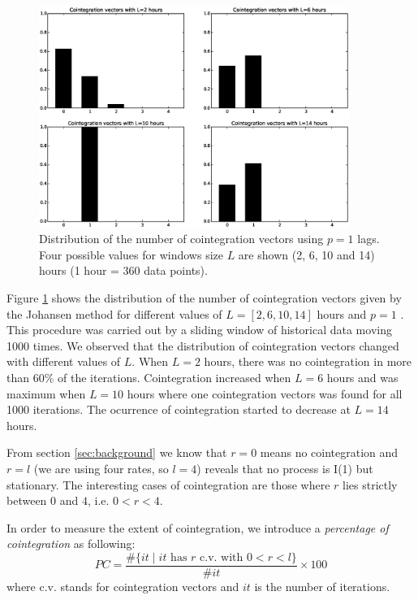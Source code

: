 \begin{figure}[!h]
  \centering
   \includegraphics[width=0.9\textwidth]{img/Fig1}
  \caption{Distribution of the number of cointegration vectors using $p=1$ lags.
  Four possible values for windows size $L$ are shown (2, 6, 10 and 14) hours (1
  hour = 360 data points).}
  \label{fig:hists}
\end{figure}

Figure \ref{fig:hists} shows the distribution of the number of cointegration
vectors given by the Johansen method for different values of $L=[2,6,10,14]$
hours and $p=1$ . This procedure was carried out by a sliding window of
historical data moving 1000 times. We observed that the distribution of
cointegration vectors changed with different values of $L$. When
$L=2$ hours, there was no cointegration in more than 60\% of the iterations.
Cointegration increased when $L=6$ hours and was maximum when $L=10$ hours where
one cointegration vectors was found for all 1000 iterations. The ocurrence of
cointegration started to decrease at $L=14$ hours.

From section \ref{sec:background} we know that $r=0$ means no cointegration and
$r=l$ (we are using four rates, so $l=4$) reveals that no process is I(1) but
stationary.  The interesting cases of cointegration are those where $r$ lies
strictly between $0$ and $4$, i.e. $0<r<4$.

In order to measure the extent of cointegration, we introduce a
{\em percentage of cointegration\/} as following:
\begin{equation} \label{eq:pcoint}
PC = 
\frac{\#\{ it \mid \text{$it$ has $r$ c.v. with $0<r<l$}\}}
     {\#it}\times 100
\end{equation}
where c.v. stands for cointegration vectors and $it$ is the number of iterations.

